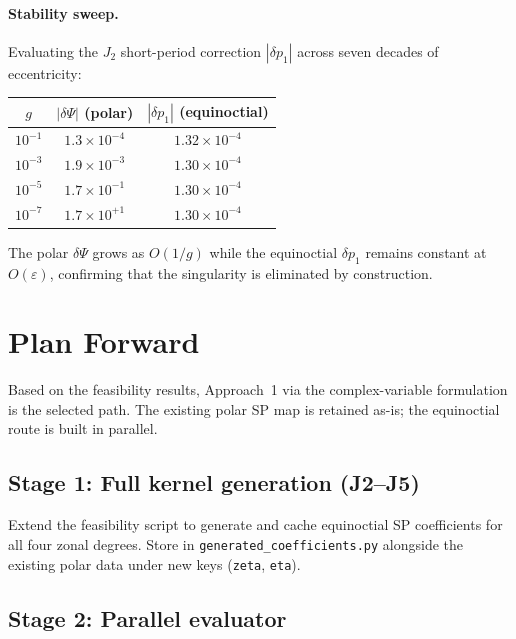 \documentclass[11pt]{article}
\begin{document}
\paragraph{Stability sweep.}
Evaluating the $J_2$ short-period correction $|\delta p_1|$ across seven
decades of eccentricity:

\medskip
\begin{center}
\begin{tabular}{ccc}
\toprule
$g$ & $|\delta\Psi|$ (polar) & $|\delta p_1|$ (equinoctial) \\
\midrule
$10^{-1}$  & $1.3 \times 10^{-4}$  & $1.32 \times 10^{-4}$ \\
$10^{-3}$  & $1.9 \times 10^{-3}$  & $1.30 \times 10^{-4}$ \\
$10^{-5}$  & $1.7 \times 10^{-1}$  & $1.30 \times 10^{-4}$ \\
$10^{-7}$  & $1.7 \times 10^{+1}$  & $1.30 \times 10^{-4}$ \\
\bottomrule
\end{tabular}
\end{center}
\medskip

\noindent
The polar $\delta\Psi$ grows as $O(1/g)$ while the equinoctial $\delta p_1$
remains constant at $O(\varepsilon)$, confirming that the singularity is
eliminated by construction.

\section{Plan Forward}
\label{sec:plan}

Based on the feasibility results, Approach~1 via the complex-variable
formulation is the selected path. The existing polar SP map is retained
as-is; the equinoctial route is built in parallel.

\subsection*{Stage 1: Full kernel generation (J2--J5)}

Extend the feasibility script to generate and cache equinoctial SP
coefficients for all four zonal degrees. Store in
\texttt{generated\_coefficients.py} alongside the existing polar data under
new keys (\texttt{zeta}, \texttt{eta}).

\subsection*{Stage 2: Parallel evaluator}
\end{document}
